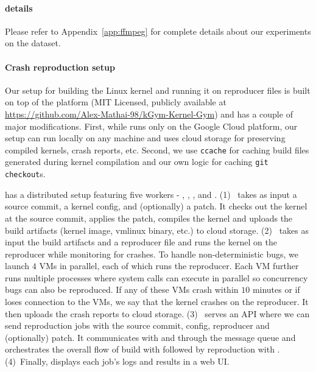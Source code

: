 \paragraph{\ffmpeg{} details}
Please refer to Appendix~\ref{app:ffmpeg} for complete details about our experiments on the \ffmpeg{} dataset.

\paragraph{Crash reproduction setup}
Our setup for building the Linux kernel and running it on reproducer files is built on top of the \kgym{} platform (MIT Licensed, publicly available at \url{https://github.com/Alex-Mathai-98/kGym-Kernel-Gym}) \citep{kgym} and has a couple of major modifications. First, while \kgym{} runs only on the Google Cloud platform, our setup can run locally on any machine and uses cloud storage for preserving compiled kernels, crash reports, etc. Second, we use \texttt{ccache} \citep{ccache} for caching build files generated during kernel compilation and our own logic for caching \texttt{git checkout}s.

\kgym{} has a distributed setup featuring five workers - \kbuilder{}, \kreproducer{}, \kscheduler{}, \kdashboard{} and \kmq{}. (1)~\kbuilder{} takes as input a source commit, a kernel config, and (optionally) a patch. It checks out the kernel at the source commit, applies the patch, compiles the kernel and uploads the build artifacts (kernel image, vmlinux binary, etc.) to cloud storage. (2)~\kreproducer{} takes as input the build artifacts and a reproducer file and runs the kernel on the reproducer while monitoring for crashes. To handle non-deterministic bugs, we launch $4$ VMs in parallel, each of which runs the reproducer. Each VM further runs multiple processes where system calls can execute in parallel so concurrency bugs can also be reproduced. If any of these VMs crash within $10$ minutes or if \kreproducer{} loses connection to the VMs, we say that the kernel crashes on the reproducer. It then uploads the crash reports to cloud storage. (3)~\kscheduler{} serves an API where we can send reproduction jobs with the source commit, config, reproducer and (optionally) patch. It communicates with \kbuilder{} and \kreproducer{} through the message queue \kmq{} and orchestrates the overall flow of build with \kbuilder{} followed by reproduction with \kreproducer{}. (4)~Finally, \kdashboard{} displays each job's logs and results in a web UI.

